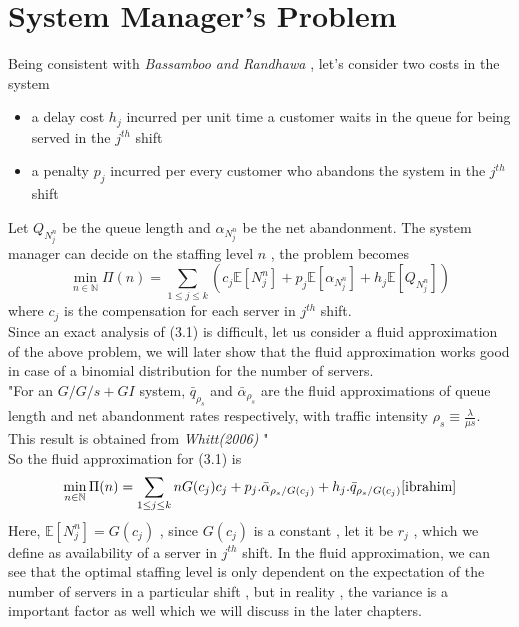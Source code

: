 \section{System Manager's Problem}
Being consistent with \textit{Bassamboo and Randhawa}\cite{bassamboo} , let's consider two costs in the system 
 \begin{itemize}
    \item a delay cost ${h_{j}}$ incurred per unit time a customer waits in the queue for being served in the $j^{th}$ shift
    \item a penalty ${p_{j}}$ incurred per every customer who abandons the system in the $j^{th}$ shift
\end{itemize}
Let $Q_{N_{j}^{n}}$ be the queue length and $\alpha_{N_{j}^{n}}$ be the net abandonment. The system manager can decide on the staffing level $n$ , the problem becomes
\begin{equation}
   \min_{n \in \mathbb{N}} \Pi(n) = \sum_{1 \leq j \leq k} ({c_{j}\mathbb{E}[N_{j}^{n}]+p_{j}\mathbb{E}[\alpha_{N_{j}^{n}}]}+h_{j}\mathbb{E}[Q_{N_{j}^{n}}])   
\end{equation}
where $c_j$ is the compensation for each server in $j^{th}$ shift.
\\ Since an exact analysis of (3.1) is difficult, let us consider a fluid approximation of the above problem, we will later show that the fluid approximation works good in case of a binomial distribution for the number of servers. 
\\ "For an $G/G/s +GI$ system, $\bar{q}_{\rho_{s}}$ and $\bar{\alpha}_{\rho_{s}}$ are the fluid approximations of queue length and net abandonment rates respectively, with traffic intensity $\rho_{s} \equiv \frac{\lambda}{\mu s}$. This result is obtained from \textit{Whitt(2006)} \cite{fluid_self}"
\\ So the fluid approximation for (3.1) is
\begin{equation}
    \min_{n \in \mathbb{N}} \Pi(n) = \sum_{1 \leq j \leq k} {n G(c_j)c_j+p_j.\bar{\alpha}_{{\rho_{s}}/{G(c_j)}}+h_j.\bar{q}_{{\rho_{s}}/{G(c_j)}}} \cite{ibrahim}
\end{equation}
Here, $\mathbb{E}[N_{j}^{n}] = G(c_j)$ , since $G(c_j)$ is a constant , let it be $r_j$ , which we define as availability of a server in $j^{th}$ shift. In the fluid approximation, we can see that the optimal staffing level is only dependent on the expectation of the number of servers in a particular shift , but in reality , the variance is a important factor as well which we will discuss in the later chapters.

